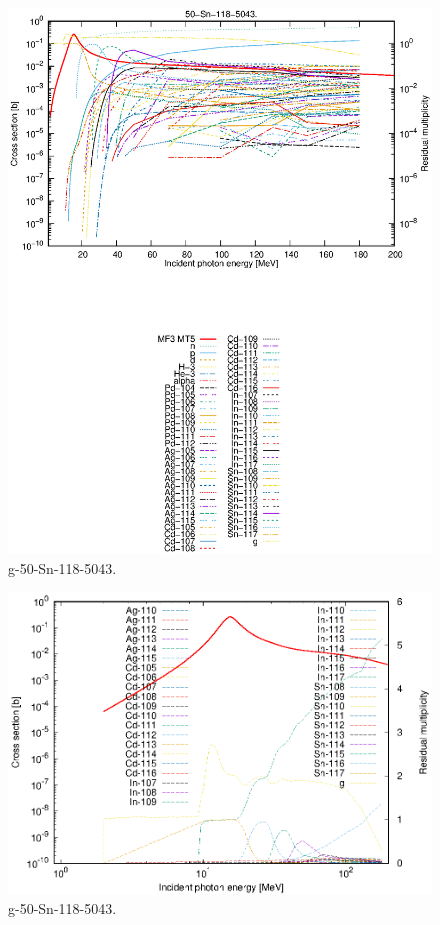 \begin{figure}
 \includegraphics[width=\linewidth]{eps/g_50-Sn-118_5043.eps}
  \caption{g-50-Sn-118-5043.}
\end{figure}
\newpage \clearpage

\begin{figure}
 \includegraphics[width=\linewidth]{eps-log/g_50-Sn-118_5043.eps}
 \caption{g-50-Sn-118-5043.}
\end{figure}
\newpage \clearpage

